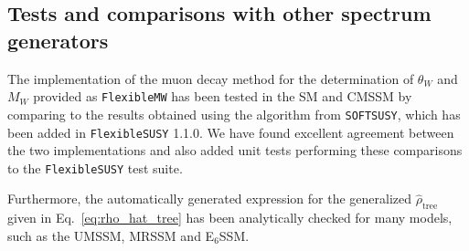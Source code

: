 \documentclass[final,3p,11pt,pdflatex]{elsarticle}
\makeatletter
\newcommand{\fs}{\texttt{FlexibleSUSY}\@\xspace}
\newcommand{\softsusy}{\texttt{SOFTSUSY}\@\xspace}
\newcommand{\fmw}{\texttt{FlexibleMW}\@\xspace}
\newcommand{\ESSM}{E$_6$SSM\@\xspace}
\makeatother
\begin{document}
\subsection{Tests and comparisons with other spectrum generators}
%
The implementation of the muon decay method for the determination
of $\theta_W$ and $M_W$ provided as \fmw has been tested in the SM
and CMSSM by comparing to the results obtained using the algorithm
from \softsusy, which has been added in \fs 1.1.0. We have found
excellent agreement between the two implementations and also added
unit tests performing these comparisons to the \fs test suite.

Furthermore, the automatically generated expression for the
generalized $\hat\rho_\text{tree}$ given in Eq.~\eqref{eq:rho_hat_tree}
has been analytically checked for many models, such as the UMSSM,
MRSSM and \ESSM.
\end{document}
